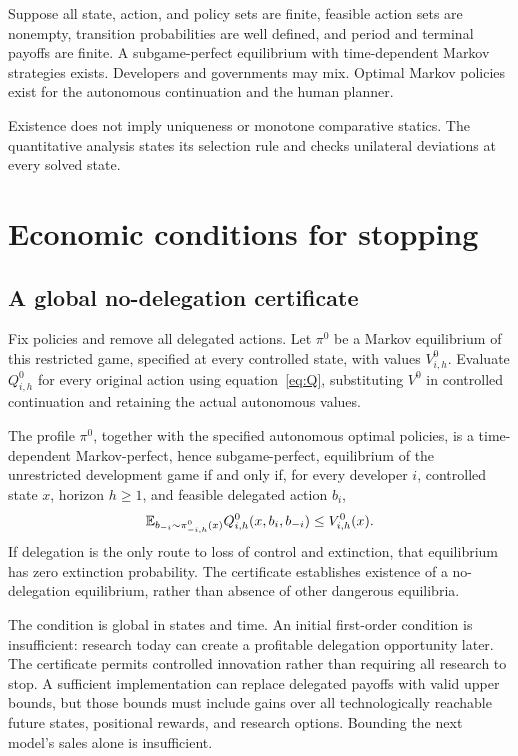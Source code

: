 \begin{theorem}[Existence]\label{thm:exist}
Suppose all state, action, and policy sets are finite, feasible action sets are nonempty, transition probabilities are well defined, and period and terminal payoffs are finite. A subgame-perfect equilibrium with time-dependent Markov strategies exists. Developers and governments may mix. Optimal Markov policies exist for the autonomous continuation and the human planner.
\end{theorem}
Existence does not imply uniqueness or monotone comparative statics. The quantitative analysis states its selection rule and checks unilateral deviations at every solved state.

\section{Economic conditions for stopping}\label{sec:stopping}
\subsection{A global no-delegation certificate}
Fix policies and remove all delegated actions. Let $\pi^0$ be a Markov equilibrium of this restricted game, specified at every controlled state, with values $V^0_{i,h}$. Evaluate $Q^0_{i,h}$ for every original action using equation~\eqref{eq:Q}, substituting $V^0$ in controlled continuation and retaining the actual autonomous values.

\begin{theorem}\label{thm:certificate}
The profile $\pi^0$, together with the specified autonomous optimal policies, is a time-dependent Markov-perfect, hence subgame-perfect, equilibrium of the unrestricted development game if and only if, for every developer $i$, controlled state $x$, horizon $h\geq1$, and feasible delegated action $b_i$,
\begin{equation}\label{eq:certificate}
 \mathbb E_{b_{-i}\sim\pi^0_{-i,h}(x)}Q^0_{i,h}(x,b_i,b_{-i})\leq V^0_{i,h}(x).
\end{equation}
If delegation is the only route to loss of control and extinction, that equilibrium has zero extinction probability. The certificate establishes existence of a no-delegation equilibrium, rather than absence of other dangerous equilibria.
\end{theorem}

The condition is global in states and time. An initial first-order condition is insufficient: research today can create a profitable delegation opportunity later. The certificate permits controlled innovation rather than requiring all research to stop. A sufficient implementation can replace delegated payoffs with valid upper bounds, but those bounds must include gains over all technologically reachable future states, positional rewards, and research options. Bounding the next model's sales alone is insufficient.

